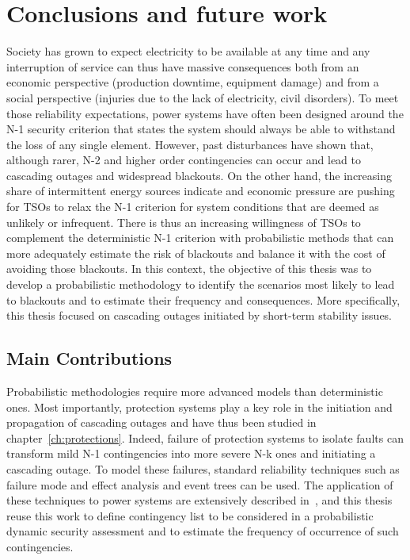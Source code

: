 
\chapter{Conclusions and future work}
\label{ch:perspectives}

Society has grown to expect electricity to be available at any time and any interruption of service can thus have massive consequences both from an economic perspective (production downtime, equipment damage) and from a social perspective (injuries due to the lack of electricity, civil disorders). To meet those reliability expectations, power systems have often been designed around the N-1 security criterion that states the system should always be able to withstand the loss of any single element. However, past disturbances have shown that, although rarer, N-2 and higher order contingencies can occur and lead to cascading outages and widespread blackouts. On the other hand, the increasing share of intermittent energy sources indicate and economic pressure are pushing for TSOs to relax the N-1 criterion for system conditions that are deemed as unlikely or infrequent. There is thus an increasing willingness of TSOs to complement the deterministic N-1 criterion with probabilistic methods that can more adequately estimate the risk of blackouts and balance it with the cost of avoiding those blackouts. In this context, the objective of this thesis was to develop a probabilistic methodology to identify the scenarios most likely to lead to blackouts and to estimate their frequency and consequences. More specifically, this thesis focused on cascading outages initiated by short-term stability issues.

\section{Main Contributions}

Probabilistic methodologies require more advanced models than deterministic ones. Most importantly, protection systems play a key role in the initiation and propagation of cascading outages and have thus been studied in chapter~\ref{ch:protections}. Indeed, failure of protection systems to isolate faults can transform mild N-1 contingencies into more severe N-k ones and initiating a cascading outage. To model these failures, standard reliability techniques such as failure mode and effect analysis and event trees can be used. The application of these techniques to power systems are extensively described in~\cite{GridPSA}, and this thesis reuse this work to define contingency list to be considered in a probabilistic dynamic security assessment and to estimate the frequency of occurrence of such contingencies.

